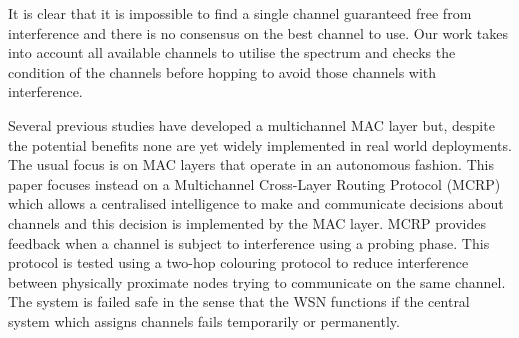 It is clear that it is impossible to find a single channel guaranteed free from interference and there is no consensus on the best channel to use. Our work takes into account all available channels to utilise the spectrum and checks the condition of the channels before hopping to avoid those channels with interference.

Several previous studies have developed a multichannel MAC layer but, despite the potential benefits none are yet widely implemented in real world deployments. The usual focus is on MAC layers that operate in an autonomous fashion. This paper focuses instead on a Multichannel Cross-Layer Routing Protocol (MCRP) which allows a centralised intelligence to make and communicate decisions about channels and this decision is implemented by the MAC layer. MCRP provides feedback when a channel is subject to interference using a probing phase. This protocol is tested using a two-hop colouring protocol to reduce interference between physically proximate nodes trying to communicate on the same channel. The system is failed safe in the sense that the WSN functions if the central system which assigns channels fails temporarily or permanently.




